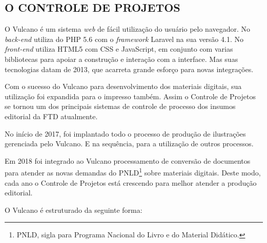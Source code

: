 \documentclass[
  12pt,				%
  openany,
  oneside,
  a4paper,			%
  english,			%
  brazil
]{article}
\numberwithin{figure}{section}
\numberwithin{table}{section}
\begin{document}
\subsection{O CONTROLE DE PROJETOS}

O Vulcano é um sistema \textit{web} de fácil utilização do usuário pelo navegador. No \textit{back-end} utiliza do PHP 5.6 com o \textit{framework} Laravel na sua versão 4.1. No \textit{front-end} utiliza HTML5 com CSS e JavaScript, em conjunto com varias bibliotecas para apoiar a construção e interação com a interface. Mas suas tecnologias datam de 2013, que acarreta grande esforço para novas integrações.

Com o sucesso do Vulcano para desenvolvimento dos materiais digitais, sua utilização foi expandida para o impresso também. Assim o Controle de Projetos se tornou um dos principais sistemas de controle de processo dos insumos editorial da FTD atualmente. 

No início de 2017, foi implantado todo o processo de produção de ilustrações gerenciada pelo Vulcano. E na sequência, para a utilização de outros processos.

Em 2018 foi integrado ao Vulcano processamento de conversão de documentos para atender as novas demandas do PNLD\footnote{PNLD, sigla para Programa Nacional do Livro e do Material Didático.} sobre materiais digitais. Deste modo, cada ano o Controle de Projetos está crescendo para melhor atender a produção editorial.

O Vulcano é estruturado da seguinte forma:
\end{document}
